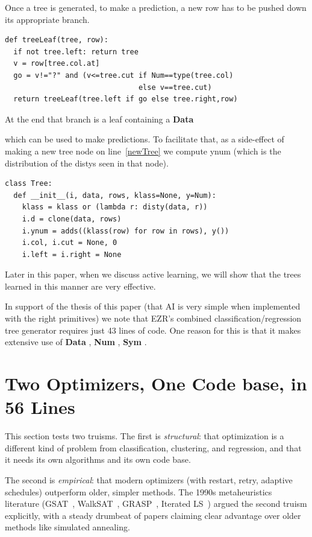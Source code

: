 \documentclass[AMA,STIX2COL]{WileyNJDv5}
\newcommand{\cls}[1]{%
  \setlength{\fboxsep}{1.5pt}%
  \colorbox{clsbg}{\sffamily\bfseries{#1}}%
}
\begin{document}
 Once a tree is generated,
 to make a prediction, a new row has to be pushed down its appropriate
branch. 
\begin{verbatim}
def treeLeaf(tree, row): 
  if not tree.left: return tree
  v = row[tree.col.at]
  go = v!="?" and (v<=tree.cut if Num==type(tree.col) 
                               else v==tree.cut)
  return treeLeaf(tree.left if go else tree.right,row)
\end{verbatim}
At the end that branch is a leaf containing a \cls{Data}
which can be used to make predictions.
To facilitate that, as a side-effect of making a new tree node on line~\ref{newTree}
we compute \textsf{ynum} (which is the distribution of 
the \textsf{disty}s seen in that node).
\begin{verbatim}
class Tree:
  def __init__(i, data, rows, klass=None, y=Num):
    klass = klass or (lambda r: disty(data, r))
    i.d = clone(data, rows)
    i.ynum = adds((klass(row) for row in rows), y())
    i.col, i.cut = None, 0
    i.left = i.right = None
\end{verbatim}
 Later in this paper, when we discuss active learning, we will show
 that the trees learned in this manner are very effective.
 
  In support of the thesis of this paper
  (that AI is very simple
  when implemented with the right primitives) we note that EZR's
  combined classification/regression tree  generator
  requires just 43 lines of code.
One reason for this is that it makes extensive use of 
\cls{Data}, \cls{Num}, \cls{Sym}.
  
\section{Two Optimizers, One Code base, in 56 Lines}\label{sec:opt}

This section tests two truisms.
The first is {\em structural}: that
optimization is a different kind of problem from classification,
clustering, and regression, and that it needs its own algorithms
and its own code base. 

The second is {\em empirical}: that modern
optimizers (with restart, retry, adaptive schedules) outperform
older, simpler methods. The 1990s metaheuristics literature
(GSAT~\cite{gsat}, WalkSAT~\cite{walksat}, GRASP~\cite{grasp},
Iterated LS~\cite{ils}) argued the second truism explicitly, with
a steady drumbeat of papers claiming clear advantage over older
methods like simulated annealing. 
\end{document}
